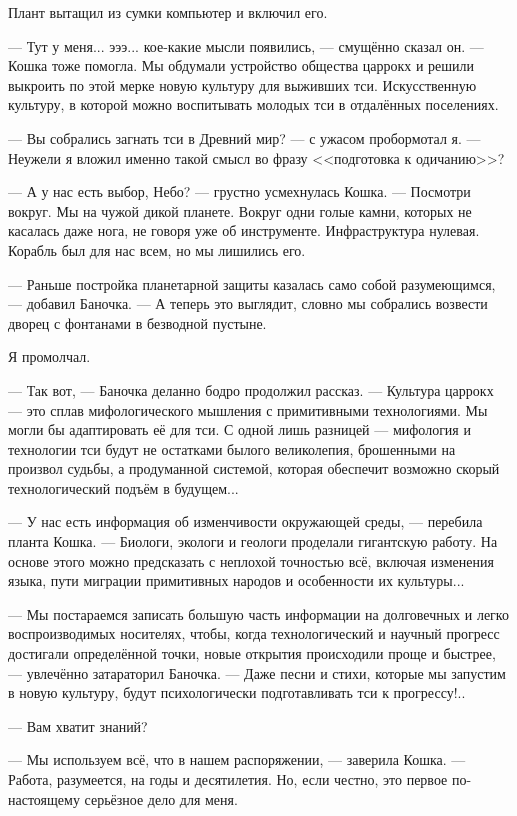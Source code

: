 Плант вытащил из сумки компьютер и включил его.

--- Тут у меня... эээ... кое-какие мысли появились, --- смущённо сказал он.
--- Кошка тоже помогла.
Мы обдумали устройство общества царрокх и решили выкроить по этой мерке новую культуру для выживших тси.
Искусственную культуру, в которой можно воспитывать молодых тси в отдалённых поселениях.

--- Вы собрались загнать тси в Древний мир? --- с ужасом пробормотал я.
--- Неужели я вложил именно такой смысл во фразу <<подготовка к одичанию>>?

--- А у нас есть выбор, Небо? --- грустно усмехнулась Кошка.
--- Посмотри вокруг.
Мы на чужой дикой планете.
Вокруг одни голые камни, которых не касалась даже нога, не говоря уже об инструменте.
Инфраструктура нулевая.
Корабль был для нас всем, но мы лишились его.

--- Раньше постройка планетарной защиты казалась само собой разумеющимся, --- добавил Баночка.
--- А теперь это выглядит, словно мы собрались возвести дворец с фонтанами в безводной пустыне.

Я промолчал.

--- Так вот, --- Баночка деланно бодро продолжил рассказ.
--- Культура царрокх --- это сплав мифологического мышления с примитивными технологиями.
Мы могли бы адаптировать её для тси.
С одной лишь разницей --- мифология и технологии тси будут не остатками былого великолепия, брошенными на произвол судьбы, а продуманной системой, которая обеспечит возможно скорый технологический подъём в будущем...

--- У нас есть информация об изменчивости окружающей среды, --- перебила планта Кошка.
--- Биологи, экологи и геологи проделали гигантскую работу.
На основе этого можно предсказать с неплохой точностью всё, включая изменения языка, пути миграции примитивных народов и особенности их культуры...

--- Мы постараемся записать большую часть информации на долговечных и легко воспроизводимых носителях, чтобы, когда технологический и научный прогресс достигали определённой точки, новые открытия происходили проще и быстрее, --- увлечённо затараторил Баночка.
--- Даже песни и стихи, которые мы запустим в новую культуру, будут психологически подготавливать тси к прогрессу!..

--- Вам хватит знаний?

--- Мы используем всё, что в нашем распоряжении, --- заверила Кошка.
--- Работа, разумеется, на годы и десятилетия.
Но, если честно, это первое по-настоящему серьёзное дело для меня.

